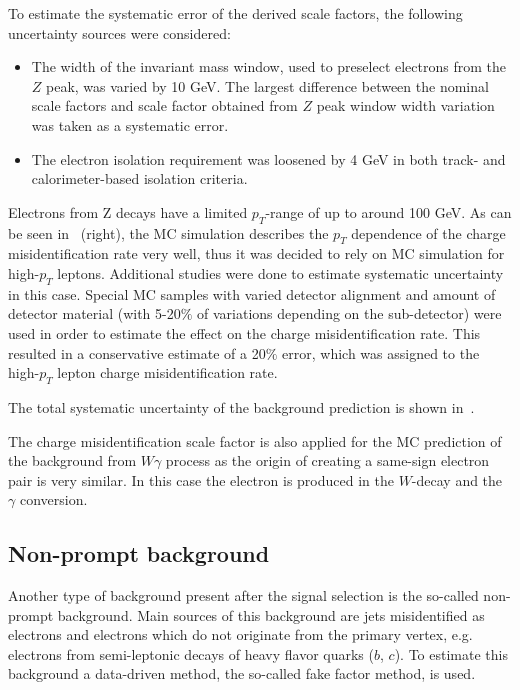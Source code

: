 To estimate the systematic error of the derived scale factors, the following uncertainty sources were considered:
\begin{itemize}
 \item The width of the invariant mass window, used to preselect electrons from the $Z$ peak, was varied by 10 GeV.
 The largest difference between the nominal scale factors and scale factor obtained from $Z$ peak window width variation was taken as a systematic error.
 \item The electron isolation requirement was loosened by 4 GeV in both track- and calorimeter-based isolation criteria.
\end{itemize}
Electrons from Z decays have a limited $p_T$-range of up to around 100 GeV. As can be seen in~ (right), 
the MC simulation describes the $p_T$ dependence of the charge misidentification rate very well, thus it was decided to rely on MC simulation 
for high-$p_T$ leptons. Additional studies were done to estimate systematic uncertainty in this case.
Special MC samples with varied detector alignment and amount of detector material (with 5-20$\%$ of variations depending on the sub-detector) 
were used in order to estimate the effect on the charge misidentification rate.
This resulted in a conservative estimate of a 20$\%$ error, which was assigned to the high-$p_T$ lepton charge misidentification rate.

The total systematic uncertainty of the background prediction is shown in~.


The charge misidentification scale factor is also applied for the MC prediction of the background from $W\gamma$ process
as the origin of creating a same-sign electron pair is very similar.
In this case the electron is produced in the $W$-decay and the $\gamma$ conversion.


\subsection{Non-prompt background}
\label{subsec:fakes_description}

Another type of background present after the signal selection is the so-called non-prompt background.
Main sources of this background are jets misidentified as electrons and electrons which do not originate from 
the primary vertex, e.g. electrons from semi-leptonic decays of heavy flavor quarks ($b$, $c$).
To estimate this background a data-driven method, the so-called fake factor method, is used.


